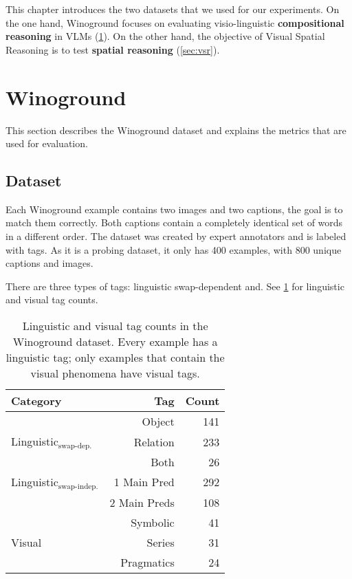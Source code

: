 This chapter introduces the two datasets that we used for our experiments. On the one hand, Winoground \cite{thrush2022winoground} focuses on evaluating visio-linguistic \textbf{compositional reasoning} in VLMs (\ref{sec:winoground}). On the other hand, the objective of Visual Spatial Reasoning \cite{liu2022visual} is to test \textbf{spatial reasoning} (\ref{sec:vsr}).

\section{Winoground} \label{sec:winoground}

This section describes the Winoground \cite{thrush2022winoground} dataset and explains the metrics that are used for evaluation.

\subsection{Dataset}

Each Winoground example contains two images and two captions, the goal
is to match them correctly. Both captions contain a completely identical set of words in a different order. The dataset was created by expert annotators and is labeled with tags. As it is a probing dataset, it only has 400 examples, with 800 unique captions and images.

There are three types of tags: linguistic swap-dependent and. See \cref{tab:stats-tag-subset} for linguistic and visual tag counts.

\begin{table}[ht]
\centering
\begin{tabular}{lrr}
\toprule
 Category & Tag    &   Count \\
\midrule
 & Object   &     141 \\
 Linguistic$_\text{swap-dep.}$ & Relation &     233 \\
 & Both &      26 \\\midrule
 Linguistic$_\text{swap-indep.}$ & 1 Main Pred & 292 \\
 & 2 Main Preds & 108 \\\midrule
 & Symbolic &  41 \\
 Visual & Series &  31 \\
 & Pragmatics &  24\\
\bottomrule
\end{tabular}
\caption{Linguistic and visual tag counts in the Winoground dataset. Every example has a linguistic tag; only examples that contain the visual phenomena have visual tags.}
\label{tab:stats-tag-subset}
\end{table}

